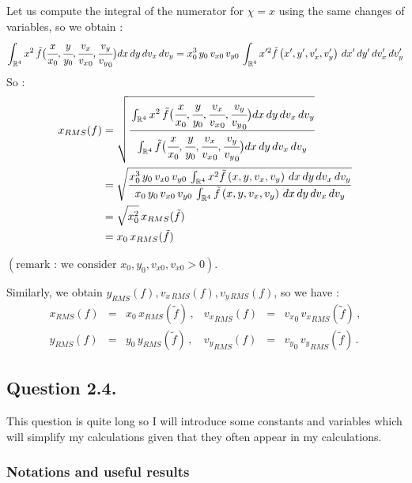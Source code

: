 \documentclass[10pt]{article}
\newcommand{\R}{{\mathbb R}}
\begin{document}
Let us compute the integral of the numerator for $\chi = x$ using the same changes of variables, so we obtain :
$$
\int_{\R^{4}} x^2\,\tilde{f}\big(\cfrac{x}{x_{0}},\cfrac{y}{y_{0}},\cfrac{v_{x}}{{v_{x}}_{0}}, \cfrac{v_{y}}{{v_{y}}_{0}}\big) dx\, dy\,dv_{x}\, dv_{y} = x_0^3\,y_0\,v_{x0}\,v_{y0}\,\int_{\R^{4}} x'^2\tilde{f}\left(x',y',v_x',v_y'\right)\,dx'\, dy'\,dv_{x}'\, dv_{y}'
$$
So :
\begin{align*}
x_{RMS}(f) &= \sqrt{\cfrac{\int_{\R^{4}} x^2\,\tilde{f}\big(\cfrac{x}{x_{0}},\cfrac{y}{y_{0}},\cfrac{v_{x}}{{v_{x}}_{0}}, \cfrac{v_{y}}{{v_{y}}_{0}}\big) dx\, dy\,dv_{x}\, dv_{y}}{\int_{\R^{4}} \tilde{f}\big(\cfrac{x}{x_{0}},\cfrac{y}{y_{0}},\cfrac{v_{x}}{{v_{x}}_{0}}, \cfrac{v_{y}}{{v_{y}}_{0}}\big) dx\, dy\,dv_{x}\, dv_{y}}} \\
&=\sqrt{\frac{x_0^3\,y_0\,v_{x0}\,v_{y0}\,\int_{\R^{4}} x^2\tilde{f}\left(x,y,v_x,v_y\right)\,dx\, dy\,dv_{x}\, dv_{y}
}{x_0\,y_0\,v_{x0}\,v_{y0}\,\int_{\R^{4}} \tilde{f}\left(x,y,v_x,v_y\right)\,dx\, dy\,dv_{x}\, dv_{y}}} \\
&= \sqrt{x_0^2}\,x_{RMS}(\tilde{f}) \\
&= x_0\,x_{RMS}(\tilde{f})
\end{align*}
\begin{center}
$\left(\mbox{remark : we consider } x_0, y_0, v_{x0}, v_{x0} > 0\right)$.
\end{center}
Similarly, we obtain $y_{RMS}(f), v_{x\,RMS}(f), v_{y\,RMS}(f)$, so we have : \\ 
$$\boxed{
\begin{array}{rclrcl}
x_{RMS}(f) &=& x_{0}\,x_{RMS}(\tilde{f}) \, , & {v_{x}}_{RMS}(f) &=& {v_{x}}_{0}\,{v_{x}}_{RMS}(\tilde{f}) \, , \\
y_{RMS}(f) &=& y_{0}\,y_{RMS}(\tilde{f}) \, , & {v_{y}}_{RMS}(f) &=& {v_{y}}_{0}\,{v_{y}}_{RMS}(\tilde{f}) \, .
\end{array}}
$$


\subsection{Question 2.4.}


This question is quite long so I will introduce some constants and variables which will simplify my calculations given that they often appear in my calculations. \\


\subsubsection{Notations and useful results}
\end{document}
